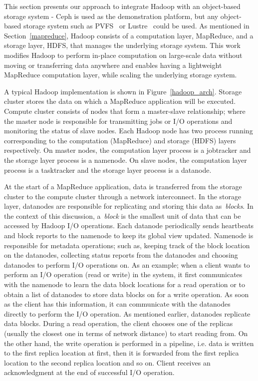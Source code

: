 \label{proposedmethod}
This section presents our approach to integrate Hadoop with
an object-based storage system - Ceph is used as the demonstration
platform, but any object-based storage system such as PVFS~\cite{Carns:2000:PPF:1268379.1268407} or
Lustre~\cite{lustre_web} could be used.
As mentioned in Section~\ref{mapreduce},
Hadoop consists of a computation layer, MapReduce, and a
storage layer, HDFS, that manages the underlying storage system. This
work modifies Hadoop to perform in-place
computation on large-scale data without moving or transferring data
anywhere and enables having a lightweight MapReduce computation layer,
while scaling the underlying storage system. 

A typical Hadoop implementation is shown in Figure~\ref{hadoop_arch}. Storage cluster
stores the data on which a MapReduce application will be executed. Compute cluster
consists of nodes that form a master-slave relationship; where the master node is
responsible for transmitting jobs or I/O operations and monitoring the status of
slave nodes. Each Hadoop node has two process running corresponding to the computation (MapReduce)
and storage (HDFS) layers respectively. On master nodes, the computation layer
process is a jobtracker and the storage layer process is a namenode. On slave nodes,
the computation layer process is a tasktracker and the storage layer process is a
datanode.

At the start of a MapReduce application, data is transferred from the storage cluster
to the compute cluster through a network interconnect. In the storage layer, datanodes
are responsible for replicating and storing this data as~\textit{blocks}. In the context
of this discussion, a~\textit{block} is the smallest unit of data that can be accessed
by Hadoop I/O operations. Each datanode periodically sends heartbeats and block reports
to the namenode to keep its global view updated. Namenode is responsible for metadata
operations; such as, keeping track
of the block location on the datanodes, collecting status reports from the datanodes and
choosing datanodes to perform I/O operations on. As an example; when a client wants to
perform an I/O operation (read or write) in the system, it first communicates with the
namenode to learn the data block locations for a read operation or to obtain a list of
datanodes to store data blocks on for a write operation. As soon as the client has this
information, it can communicate with the datanodes directly to perform the I/O operation.
As mentioned earlier, datanodes replicate data blocks. During a read operation, the client
chooses one of the replicas (usually the closest one in terms of network distance) to
start reading from. On the other hand, the write operation is performed in a pipeline, i.e.
data is written to the first replica location at first, then it is forwarded from the first
replica location to the second replica location and so on. Client receives an acknowledgment
at the end of successful I/O operation.
 
